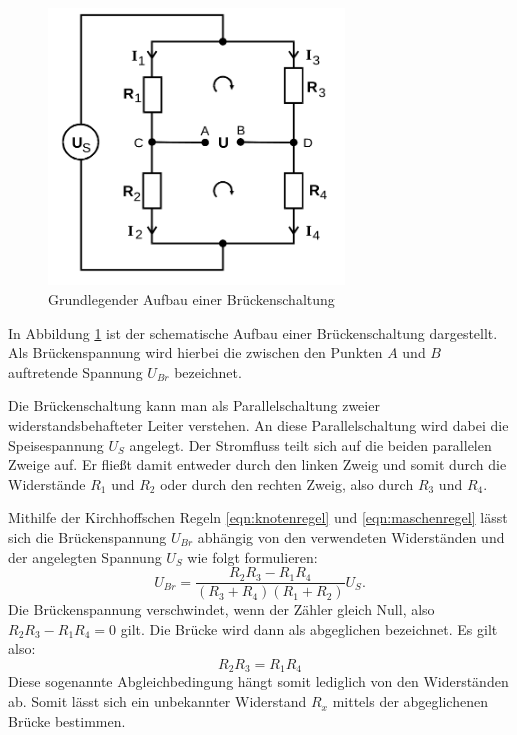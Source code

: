 \begin{figure}
  \centering
  \includegraphics[width=0.7\textwidth]{Bilder/brueckenschaltungallgemein.png}
  \caption{Grundlegender Aufbau einer Brückenschaltung \cite{Anleitung}}
  \label{fig:brückenschaltung}
\end{figure}
In Abbildung \ref{fig:brückenschaltung} ist der schematische Aufbau einer Brückenschaltung dargestellt.
Als Brückenspannung wird hierbei die zwischen den Punkten $A$ und $B$ auftretende Spannung $U_{Br}$ bezeichnet.

Die Brückenschaltung kann man als Parallelschaltung zweier widerstandsbehafteter Leiter verstehen. An diese Parallelschaltung wird dabei die Speisespannung $U_S$ angelegt.
Der Stromfluss teilt sich auf die beiden parallelen Zweige auf. Er fließt damit entweder durch den linken Zweig und somit durch die Widerstände $R_1$ und $R_2$ oder durch den rechten Zweig, also durch $R_3$ und $R_4$.

Mithilfe der Kirchhoffschen Regeln \eqref{eqn:knotenregel} und \eqref{eqn:maschenregel} lässt sich die Brückenspannung $U_{Br}$ abhängig von den verwendeten Widerständen und der angelegten Spannung $U_S$ wie folgt formulieren:
\begin{equation}
  \label{eqn:brückeeingang}
U_{Br}=\frac{R_2R_3-R_1R_4}{(R_3+R_4)(R_1+R_2)}U_S .
\end{equation}
Die Brückenspannung verschwindet, wenn der Zähler gleich Null, also $R_2R_3-R_1R_4=0$ gilt.
Die Brücke wird dann als abgeglichen bezeichnet. Es gilt also:
\begin{equation}
R_2R_3=R_1R_4
\label{eqn:abgleichbedingung}
\end{equation}
Diese sogenannte Abgleichbedingung hängt somit lediglich von den Widerständen ab. Somit lässt sich ein unbekannter Widerstand $R_x$ mittels der abgeglichenen Brücke bestimmen.

